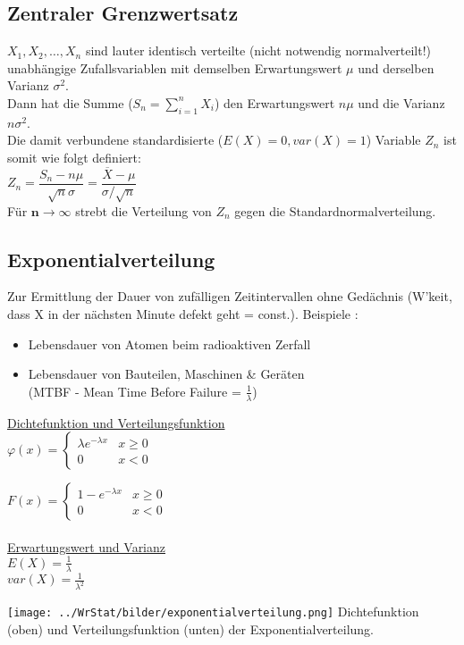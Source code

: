 \subsection{Zentraler Grenzwertsatz  }
  	$X_1, X_2, \ldots , X_n$ sind lauter identisch verteilte (nicht notwendig normalverteilt!)
  	unabhängige Zufallsvariablen mit demselben Erwartungswert $\mu$ und derselben Varianz $\sigma^2$.  	\\ 
  	Dann hat die Summe ($S_n = \sum_{i=1}^n X_i$) den Erwartungswert $n \mu$ und die Varianz $n \sigma^2$. \\
  	Die damit verbundene standardisierte ($E(X) = 0, var(X) = 1$) Variable $Z_n$ ist somit wie
  	folgt definiert: \\ $ Z_n = \dfrac{S_n - n \mu}{\sqrt{n} \sigma} = \dfrac{\overline{X} - \mu}{\sigma / \sqrt{n}}$\\
  	Für $\boldsymbol{n \to \infty}$ strebt die Verteilung von $Z_n$ gegen die Standardnormalverteilung.

\subsection{Exponentialverteilung }
	\begin{minipage}{10cm}
	Zur Ermittlung der Dauer von zufälligen Zeitintervallen ohne Gedächnis
	(W'keit, dass X in der nächsten Minute defekt geht = const.). Beispiele :
	\begin{itemize}
      \item Lebensdauer von Atomen beim radioaktiven Zerfall
      \item Lebensdauer von Bauteilen, Maschinen \& Geräten\\(MTBF -
      Mean Time Before Failure = $\frac{1}{\lambda}$)
    \end{itemize}
    
	\underline{Dichtefunktion und Verteilungsfunktion}\\
    $\varphi(x)=\begin{cases}
	\lambda e^{-\lambda x}  & x \geq 0\\
	0						& x < 0
	\end{cases}$
	
	$F(x)=\begin{cases}
	1-e^{-\lambda x}  		& x \geq 0\\
	0	 					& x < 0
	\end{cases}$\\ \\

	\underline{Erwartungswert und Varianz}\\
	$E(X)=\frac{1}{\lambda}$\\
	$var(X)=\frac{1}{\lambda^2}$ \\
    \end{minipage}
	\begin{minipage}{8cm}
    \texttt{[image: ../WrStat/bilder/exponentialverteilung.png]}
	Dichtefunktion (oben) und Verteilungsfunktion (unten) der Exponentialverteilung.
    \end{minipage}

